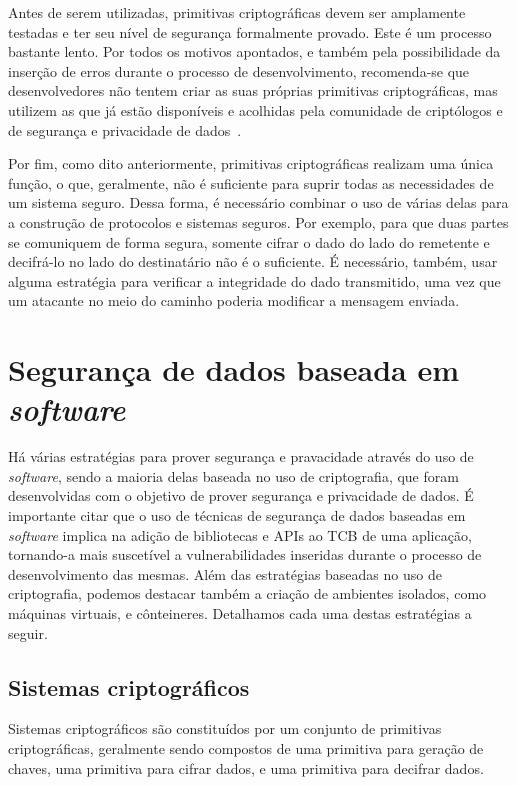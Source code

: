 Antes de serem utilizadas, primitivas criptográficas devem ser amplamente
testadas e ter seu nível de segurança formalmente provado. Este é um processo
bastante lento. Por todos os motivos apontados, e também pela possibilidade da
inserção de erros durante o processo de desenvolvimento, recomenda-se que
desenvolvedores não tentem criar as suas próprias primitivas criptográficas, mas
utilizem as que já estão disponíveis e acolhidas pela comunidade de criptólogos
e de segurança e privacidade de dados~\cite{menezes1996handbook}.

Por fim, como dito anteriormente, primitivas criptográficas realizam uma única
função, o que, geralmente, não é suficiente para suprir todas as necessidades de
um sistema seguro. Dessa forma, é necessário combinar o uso de várias delas para
a construção de protocolos e sistemas seguros. Por exemplo, para que duas partes
se comuniquem de forma segura, somente cifrar o dado do lado do remetente e
decifrá-lo no lado do destinatário não é o suficiente. É necessário, também,
usar alguma estratégia para verificar a integridade do dado transmitido, uma vez
que um atacante no meio do caminho poderia modificar a mensagem enviada.

\section{Segurança de dados baseada em \textit{software}}
\label{sec:estadoarte_seg_soft}

Há várias estratégias para prover segurança e pravacidade através do uso de
\textit{software}, sendo a maioria delas baseada no uso de criptografia, que
foram desenvolvidas com o objetivo de prover segurança e privacidade de dados.
É importante citar que o uso de técnicas de segurança de dados baseadas em
\textit{software} implica na adição de bibliotecas e APIs ao TCB de uma
aplicação, tornando-a mais suscetível a vulnerabilidades inseridas durante o
processo de desenvolvimento das mesmas.
Além das estratégias baseadas no uso de criptografia, podemos destacar também a
criação de ambientes isolados, como máquinas virtuais, e cônteineres. Detalhamos
cada uma destas estratégias a seguir.

\subsection{Sistemas criptográficos}
\label{subsec:estadoarte_segsoft_sistemas_cripto}

Sistemas criptográficos são constituídos por um conjunto de primitivas
criptográficas, geralmente sendo compostos de uma primitiva para geração de
chaves, uma primitiva para cifrar dados, e uma primitiva para decifrar dados.

